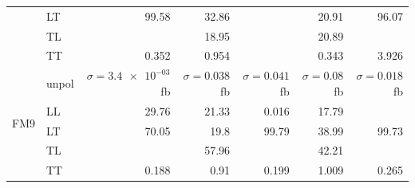 \begin{table}[h]
{\begin{tabular}{llrrrrr}
 & LT & \num{99.58} & \num{32.86} &  & \num{20.91} & \num{96.07} \\
 & TL &  & \num{18.95} &  & \num{20.89} &  \\
 & TT & \num{0.352} & \num{0.954} &  & \num{0.343} & \num{3.926} \\
\midrule
\multirow{5}{*}{FM9}
 & unpol & $\sigma = \num{3.4e-03}$ fb & $\sigma = \num{0.038}$ fb & $\sigma = \num{0.041}$ fb & $\sigma = \num{0.08}$ fb & $\sigma = \num{0.018}$ fb \\
 & LL & \num{29.76} & \num{21.33} & \num{0.016} & \num{17.79} &  \\
 & LT & \num{70.05} & \num{19.8} & \num{99.79} & \num{38.99} & \num{99.73} \\
 & TL &  & \num{57.96} &  & \num{42.21} &  \\
 & TT & \num{0.188} & \num{0.91} & \num{0.199} & \num{1.009} & \num{0.265} \\
\bottomrule
\end{tabular}
}%
\end{table}